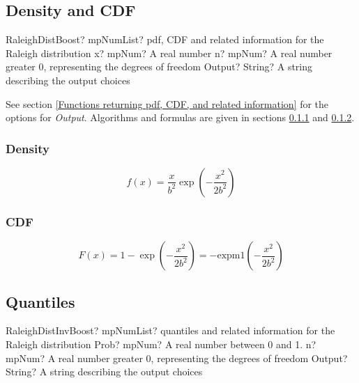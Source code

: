 \subsection{Density and CDF}

\begin{mpFunctionsExtract}
	\mpFunctionThreeNotImplemented
	{RaleighDistBoost? mpNumList? pdf, CDF and related information for the Raleigh distribution}
	{x? mpNum? A real number}
	{n? mpNum? A real number greater 0, representing the degrees of freedom}
	{Output? String? A string describing the output choices}
\end{mpFunctionsExtract}


\vspace{0.3cm}
See section \ref{Functions returning pdf, CDF, and related information} for the options for {\itshape\sffamily Output}. Algorithms and formulas are given in sections \ref{RaleighDistributionDensity} and \ref{RaleighDistributionCDF}.


\subsubsection{Density}
\label{RaleighDistributionDensity}

\begin{equation} 
	f(x)= \frac{x}{b^2} \exp \left(- \frac{x^2}{2b^2}\right)
\end{equation}


\subsubsection{CDF}
\label{RaleighDistributionCDF}

\begin{equation} 
	F(x)= 1 - \exp \left(- \frac{x^2}{2b^2}\right)
	= -\text{expm1} \left(- \frac{x^2}{2b^2}\right)
\end{equation}



\subsection{Quantiles}

\begin{mpFunctionsExtract}
	\mpFunctionThreeNotImplemented
	{RaleighDistInvBoost? mpNumList? quantiles and related information for the Raleigh distribution}
	{Prob? mpNum? A real number between 0 and 1.}
	{n? mpNum? A real number greater 0, representing the degrees of freedom}
	{Output? String? A string describing the output choices}
\end{mpFunctionsExtract}

